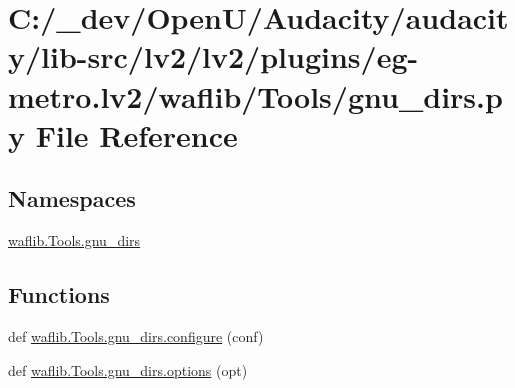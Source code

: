 \hypertarget{lv2_2plugins_2eg-metro_8lv2_2waflib_2_tools_2gnu__dirs_8py}{}\section{C\+:/\+\_\+dev/\+Open\+U/\+Audacity/audacity/lib-\/src/lv2/lv2/plugins/eg-\/metro.lv2/waflib/\+Tools/gnu\+\_\+dirs.py File Reference}
\label{lv2_2plugins_2eg-metro_8lv2_2waflib_2_tools_2gnu__dirs_8py}
\subsection*{Namespaces}
\begin{DoxyCompactItemize}
\item 
 \hyperlink{namespacewaflib_1_1_tools_1_1gnu__dirs}{waflib.\+Tools.\+gnu\+\_\+dirs}
\end{DoxyCompactItemize}
\subsection*{Functions}
\begin{DoxyCompactItemize}
\item 
def \hyperlink{namespacewaflib_1_1_tools_1_1gnu__dirs_a03d9dce5a06f4f739652667447f57eb9}{waflib.\+Tools.\+gnu\+\_\+dirs.\+configure} (conf)
\item 
def \hyperlink{namespacewaflib_1_1_tools_1_1gnu__dirs_ad291b2ee61d479ae1005acd11eaf6ead}{waflib.\+Tools.\+gnu\+\_\+dirs.\+options} (opt)
\end{DoxyCompactItemize}

